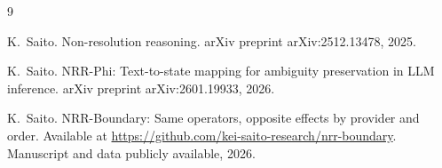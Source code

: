 \documentclass[11pt,a4paper]{article}
\begin{document}
\begin{thebibliography}{9}

K.~Saito.
\newblock Non-resolution reasoning.
\newblock arXiv preprint arXiv:2512.13478, 2025.

K.~Saito.
\newblock NRR-Phi: Text-to-state mapping for ambiguity preservation in LLM inference.
\newblock arXiv preprint arXiv:2601.19933, 2026.

K.~Saito.
\newblock NRR-Boundary: Same operators, opposite effects by provider and order.
\newblock Available at \url{https://github.com/kei-saito-research/nrr-boundary}. Manuscript and data publicly available, 2026.

\end{thebibliography}
\end{document}
